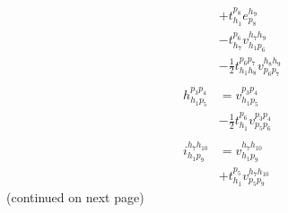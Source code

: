 \documentclass{article}
\begin{document}
\begin{align}
                                      &+ t ^{ p_{8} } _{ h_{1} } e ^{ h_{9} } _{ p_{8} }\tag{ccsd\_t2\_4\_2}\\
                                      &- t ^{ p_{6} } _{ h_{7} } v ^{ h_{7} h_{9} } _{ h_{1} p_{6} }\tag{ccsd\_t2\_4\_3}\\
                                      &- \frac{1}{2} t ^{ p_{6} p_{7} } _{ h_{1} h_{8} } v ^{ h_{8} h_{9} } _{ p_{6} p_{7} }\tag{ccsd\_t2\_4\_4}\\
\nonumber\\
h ^{ p_{3} p_{4} } _{ h_{1} p_{5} }   &= v ^{ p_{3} p_{4} } _{ h_{1} p_{5} }\tag{ccsd\_t2\_3\_1}\\
                                      &- \frac{1}{2} t ^{ p_{6} } _{ h_{1} } v ^{ p_{3} p_{4} } _{ p_{5} p_{6} }\tag{ccsd\_t2\_3\_2}\\
\nonumber\\
i ^{ h_{7} h_{10} } _{ h_{1} p_{9} }  &= v ^{ h_{7} h_{10} } _{ h_{1} p_{9} }\tag{ccsd\_t2\_2\_5\_1}\\
                                      &+ t ^{ p_{5} } _{ h_{1} } v ^{ h_{7} h_{10} } _{ p_{5} p_{9} }\tag{ccsd\_t2\_2\_5\_2}
\end{align}
(continued on next page)
\newpage
\end{document}
